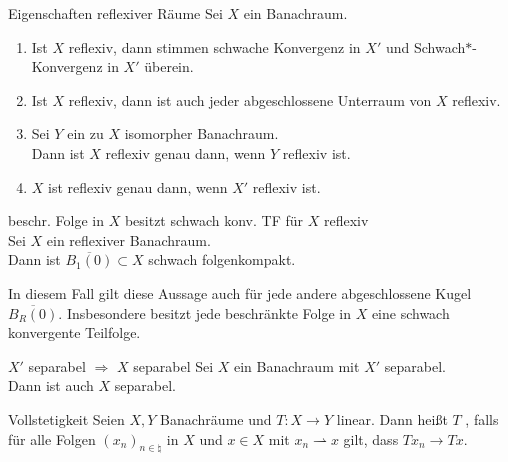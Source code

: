 \begin{Lemma}{Eigenschaften reflexiver Räume}
    Sei $X$ ein Banachraum.
    \begin{enumerate}
        \item
        Ist $X$ reflexiv, dann stimmen schwache Konvergenz in $X'$ und
        Schwach$\ast$-Konvergenz in $X'$ überein.

        \item
        Ist $X$ reflexiv, dann ist auch jeder abgeschlossene Unterraum von $X$ reflexiv.

        \item
        Sei $Y$ ein zu $X$ isomorpher Banachraum.\\
        Dann ist $X$ reflexiv genau dann, wenn $Y$ reflexiv ist.

        \item
        $X$ ist reflexiv genau dann, wenn $X'$ reflexiv ist.
    \end{enumerate}
\end{Lemma}

\linie

\begin{Satz}{beschr. Folge in $X$ besitzt schwach konv. TF für $X$ reflexiv}\\
    Sei $X$ ein reflexiver Banachraum.\\
    Dann ist $\overline{B_1(0)} \subset X$ schwach folgenkompakt.
\end{Satz}

\begin{Bem}
    In diesem Fall gilt diese Aussage auch für jede andere abgeschlossene Kugel
    $\overline{B_R(0)}$.
    Insbesondere besitzt jede beschränkte Folge in $X$ eine schwach konvergente Teilfolge.
\end{Bem}

\begin{Lemma}{$X'$ separabel $\Rightarrow$ $X$ separabel}
    Sei $X$ ein Banachraum mit $X'$ separabel.\\
    Dann ist auch $X$ separabel.
\end{Lemma}

\linie

\begin{Def}{Vollstetigkeit}
    Seien $X, Y$ Banachräume und $T\colon X \rightarrow Y$ linear.
    Dann heißt $T$ , falls
    für alle Folgen $(x_n)_{n \in \natural}$ in $X$ und $x \in X$ mit $x_n \rightharpoonup x$
    gilt, dass $Tx_n \to Tx$.
\end{Def}

